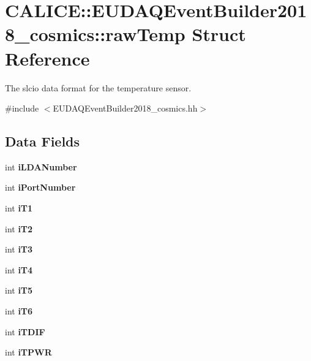 \section{C\-A\-L\-I\-C\-E\-:\-:E\-U\-D\-A\-Q\-Event\-Builder2018\-\_\-cosmics\-:\-:raw\-Temp Struct Reference}
\label{structCALICE_1_1EUDAQEventBuilder2018__cosmics_1_1rawTemp}


The slcio data format for the temperature sensor.  




{\ttfamily \#include $<$E\-U\-D\-A\-Q\-Event\-Builder2018\-\_\-cosmics.\-hh$>$}

\subsection*{Data Fields}
\begin{DoxyCompactItemize}
\item 
int {\bfseries i\-L\-D\-A\-Number}\label{structCALICE_1_1EUDAQEventBuilder2018__cosmics_1_1rawTemp_a331691ac94c45140cd3a33a027b75cd6}

\item 
int {\bfseries i\-Port\-Number}\label{structCALICE_1_1EUDAQEventBuilder2018__cosmics_1_1rawTemp_a133250985266c2d9dd2b6942546deefe}

\item 
int {\bfseries i\-T1}\label{structCALICE_1_1EUDAQEventBuilder2018__cosmics_1_1rawTemp_a3e4ad44d3c3c58a3da05e7ccafb37a8d}

\item 
int {\bfseries i\-T2}\label{structCALICE_1_1EUDAQEventBuilder2018__cosmics_1_1rawTemp_a5a4573acd2cdfb1e30359a3e7a5f24c1}

\item 
int {\bfseries i\-T3}\label{structCALICE_1_1EUDAQEventBuilder2018__cosmics_1_1rawTemp_a53c5dbc3fc7a678509e7f80cf481760b}

\item 
int {\bfseries i\-T4}\label{structCALICE_1_1EUDAQEventBuilder2018__cosmics_1_1rawTemp_acb0e33f538da629d5984418d5377df0c}

\item 
int {\bfseries i\-T5}\label{structCALICE_1_1EUDAQEventBuilder2018__cosmics_1_1rawTemp_a7a42e0746e21a5a15314c01743a060ff}

\item 
int {\bfseries i\-T6}\label{structCALICE_1_1EUDAQEventBuilder2018__cosmics_1_1rawTemp_a1fd998eaf6b91fa73ae525aa493c2a45}

\item 
int {\bfseries i\-T\-D\-I\-F}\label{structCALICE_1_1EUDAQEventBuilder2018__cosmics_1_1rawTemp_a6b76a1330b9097cb6117272ae8a19022}

\item 
int {\bfseries i\-T\-P\-W\-R}\label{structCALICE_1_1EUDAQEventBuilder2018__cosmics_1_1rawTemp_a657e1792cf544073a892511610b292c8}

\end{DoxyCompactItemize}


